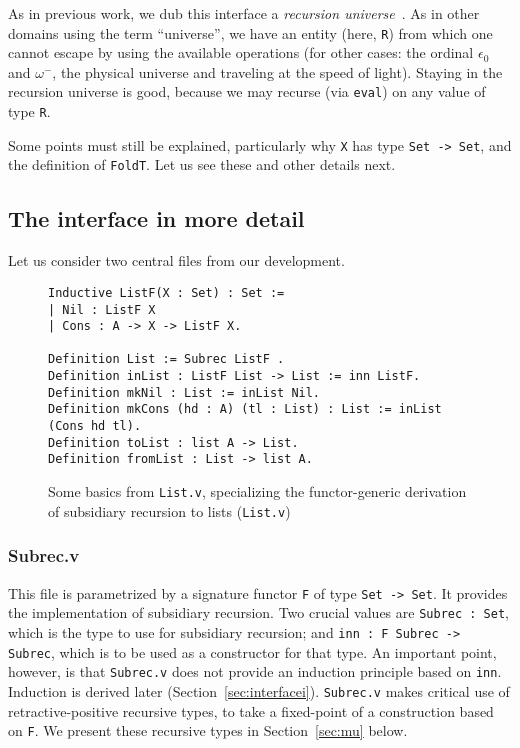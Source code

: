 \documentclass[a4paper,USenglish]{lipics-v2021}
\begin{document}
As in previous work, we dub this interface a \emph{recursion
universe}~\cite{stump20}.  As in other domains using the term
``universe'', we have an entity (here, \verb|R|) from which one cannot
escape by using the available operations (for other cases:
the ordinal $\epsilon_0$ and $\omega^-$, the physical universe and traveling at
the speed of light).  Staying in the recursion universe is good,
because we may recurse (via \verb|eval|) on any value of type
\verb|R|.

Some points must still be explained, particularly why \verb|X| has type \verb|Set -> Set|,
and the definition of \verb|FoldT|.  Let us see these and other details next.

\subsection{The interface in more detail}

Let us consider two central files from our development.

\begin{figure}
  \begin{verbatim}
Inductive ListF(X : Set) : Set :=
| Nil : ListF X
| Cons : A -> X -> ListF X.

Definition List := Subrec ListF .
Definition inList : ListF List -> List := inn ListF.
Definition mkNil : List := inList Nil.
Definition mkCons (hd : A) (tl : List) : List := inList (Cons hd tl).
Definition toList : list A -> List.
Definition fromList : List -> list A.
\end{verbatim}
  \caption{Some basics from \texttt{List.v}, specializing the functor-generic derivation of subsidiary recursion to lists (\texttt{List.v})}
  \label{fig:listf}
\end{figure}

\subsubsection{Subrec.v}

  This file is parametrized by a signature functor \verb|F| of type
  \verb|Set -> Set|.  It provides the implementation of subsidiary
  recursion.  Two crucial values are \verb|Subrec : Set|, which is the
  type to use for subsidiary recursion; and
  \verb|inn : F Subrec -> Subrec|, which is to be used as a
  constructor for that type.  An important point, however, is that
  \verb|Subrec.v| does not provide an induction principle based on
  \verb|inn|.  Induction is derived later
  (Section~\ref{sec:interfacei}). \verb|Subrec.v| makes critical use
  of retractive-positive recursive types, to take a fixed-point of a
  construction based on \verb|F|.  We present these recursive
  types in Section~\ref{sec:mu} below.
\end{document}
